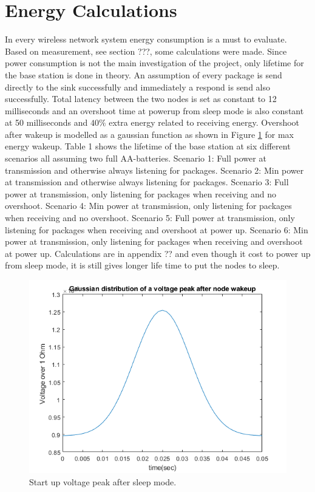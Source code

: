 \section{Energy Calculations}\label{sc:energyCalculations}
In every wireless network system energy consumption is a must to evaluate. Based on measurement, see section ???, some calculations were made. Since power consumption is not the main investigation of the project, only lifetime for the base station is done in theory. An assumption of every package is send directly to the sink successfully and immediately a respond is send also successfully. Total latency between the two nodes is set as constant to 12 milliseconds and an overshoot time at powerup from sleep mode is also constant at 50 milliseconds and $40\%$ extra energy related to receiving energy. Overshoot after wakeup is modelled as a gaussian function as shown in Figure \ref{fig:gaussianDistributionsOfVoltagePeak} for max energy wakeup. Table 1 shows the lifetime of the base station at six different scenarios all assuming two full AA-batteries.
Scenario 1: Full power at transmission and otherwise always listening for packages.
Scenario 2: Min power at transmission and otherwise always listening for packages.
Scenario 3: Full power at transmission, only listening for packages when receiving and no overshoot.
Scenario 4: Min power at transmission, only listening for packages when receiving and no overshoot.
Scenario 5: Full power at transmission, only listening for packages when receiving and overshoot at power up.
Scenario 6: Min power at transmission, only listening for packages when receiving and overshoot at power up.
Calculations are in appendix ?? and even though it cost to power up from sleep mode, it is still gives longer life time to put the nodes to sleep.

\begin{figure}[H]
	\centering
	\includegraphics[width=\linewidth]{theory/energyCalculations/fig/gaussianDistributionsOfVoltagePeak.png}
	\caption{Start up voltage peak after sleep mode.}
	\label{fig:gaussianDistributionsOfVoltagePeak}
\end{figure}
